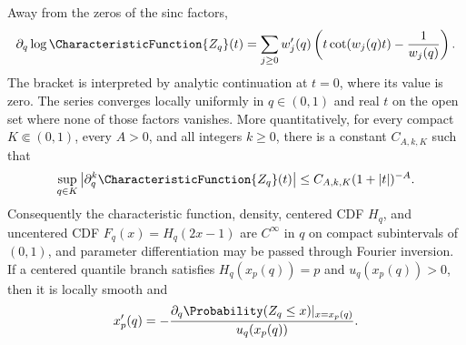 \begin{proposition}
\label{prop:fr-fourier-score}
Away from the zeros of the sinc factors,
\begin{equation}
 \partial_q\log\CharacteristicFunction{Z_q}(t)
 =\sum_{j\ge0}w_j'(q)
 \left(t\cot(w_j(q)t)-\frac1{w_j(q)}\right).
 \label{eq:fr-fourier-score}
\end{equation}
The bracket is interpreted by analytic continuation at \(t=0\), where its
value is zero.
The series converges locally uniformly in \(q\in(0,1)\) and real \(t\) on the
open set where none of those factors vanishes.  More quantitatively, for every
compact \(K\Subset(0,1)\), every \(A>0\), and all integers \(k\ge0\), there is
a constant \(C_{A,k,K}\) such that
\begin{equation}
 \sup_{q\in K}\left|\partial_q^k\CharacteristicFunction{Z_q}(t)\right|
 \le C_{A,k,K}(1+|t|)^{-A}.
 \label{eq:fr-q-derivative-rapid}
\end{equation}
Consequently the characteristic function, density, centered CDF \(H_q\), and
uncentered CDF \(F_q(x)=H_q(2x-1)\) are \(C^\infty\) in \(q\) on compact
subintervals of \((0,1)\), and parameter differentiation may be passed
through Fourier inversion.  If a centered quantile branch satisfies
\(H_q(x_p(q))=p\) and \(u_q(x_p(q))>0\), then it is locally smooth and
\begin{equation}
 x_p'(q)=-\frac{\partial_q\Probability(Z_q\le x)|_{x=x_p(q)}}{u_q(x_p(q))}.
 \label{eq:fr-quantile-sensitivity}
\end{equation}
\end{proposition}

